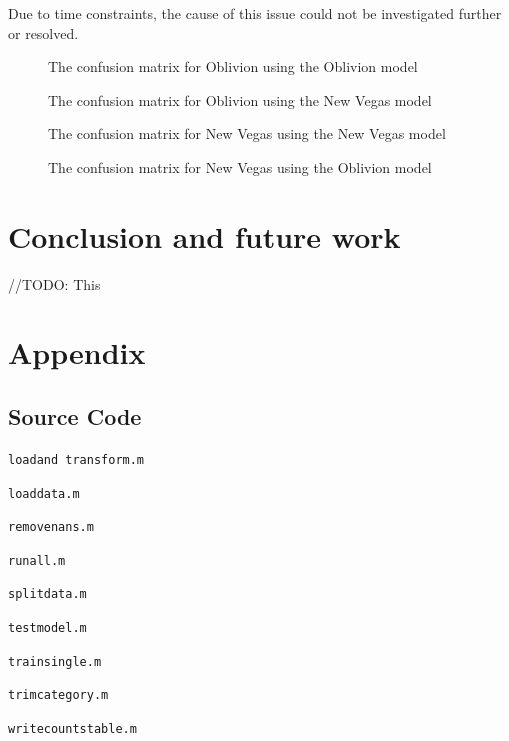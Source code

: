 \documentclass[journal]{IEEEtran}
\newcommand{\codelisting}[2]{
    \texttt{#1}
    
}
\begin{document}
Due to time constraints, the cause of this issue could not be investigated further
or resolved.

\begin{figure}
    
    \caption{The confusion matrix for Oblivion using the Oblivion model}
    \label{fig:confusion_ob_same}
\end{figure}

\begin{figure}
    
    \caption{The confusion matrix for Oblivion using the New Vegas model}
    \label{fig:confusion_ob}
\end{figure}

\begin{figure}
    
    \caption{The confusion matrix for New Vegas using the New Vegas model}
    \label{fig:confusion_nv_same}
\end{figure}

\begin{figure}
    
    \caption{The confusion matrix for New Vegas using the Oblivion model}
    \label{fig:confusion_nv}
\end{figure}

\section{Conclusion and future work}
//TODO: This


\section*{Appendix}
\subsection*{Source Code}

\codelisting{load\textunderscore and \textunderscore transform.m}{src/load_and_transform.m}
\codelisting{load\textunderscore data.m}{src/load_data.m}
\codelisting{remove\textunderscore nans.m}{src/remove_nans.m}
\codelisting{run\textunderscore all.m}{src/run_all.m}
\codelisting{split\textunderscore data.m}{src/split_data.m}
\codelisting{test\textunderscore model.m}{src/test_model.m}
\codelisting{train\textunderscore single.m}{src/train_single.m}
\codelisting{trim\textunderscore category.m}{src/trim_category.m}
\codelisting{write\textunderscore counts\textunderscore table.m}{src/write_counts_table.m}




\end{document}
